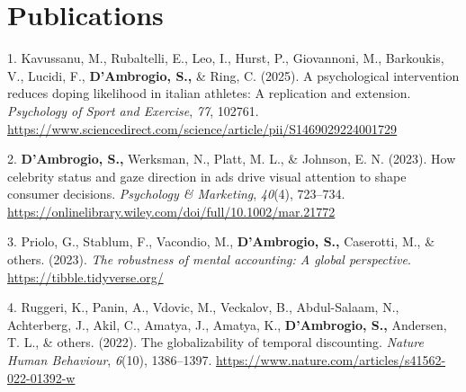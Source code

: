 \documentclass[11pt,a4paper,]{awesome-cv}
\newlength{\cslhangindent}
\newenvironment{CSLReferences}[2] %
 {\begin{list}{}{%
  \setlength{\itemindent}{0pt}
  \setlength{\leftmargin}{0pt}
  \setlength{\parsep}{0pt}
  \ifodd #1
   \setlength{\leftmargin}{\cslhangindent}
   \setlength{\itemindent}{-1\cslhangindent}
  \fi
  \setlength{\itemsep}{#2\baselineskip}}}
 {\end{list}}
\begin{document}
\section{Publications}\label{publications}

\label{refs-c5ea07e26ef96443943e38a4ce333d99}
\begin{CSLReferences}{1}{0}
1. Kavussanu, M., Rubaltelli, E., Leo, I., Hurst, P., Giovannoni, M.,
Barkoukis, V., Lucidi, F., \textbf{D'Ambrogio, S.,} \& Ring, C. (2025).
A psychological intervention reduces doping likelihood in italian
athletes: A replication and extension. \emph{Psychology of Sport and
Exercise}, \emph{77}, 102761.
\url{https://www.sciencedirect.com/science/article/pii/S1469029224001729}

2. \textbf{D'Ambrogio, S.,} Werksman, N., Platt, M. L., \& Johnson, E.
N. (2023). How celebrity status and gaze direction in ads drive visual
attention to shape consumer decisions. \emph{Psychology \& Marketing},
\emph{40}(4), 723--734.
\url{https://onlinelibrary.wiley.com/doi/full/10.1002/mar.21772}

3. Priolo, G., Stablum, F., Vacondio, M., \textbf{D'Ambrogio, S.,}
Caserotti, M., \& others. (2023). \emph{The robustness of mental
accounting: A global perspective}. \url{https://tibble.tidyverse.org/}

4. Ruggeri, K., Panin, A., Vdovic, M., Veckalov, B., Abdul-Salaam, N.,
Achterberg, J., Akil, C., Amatya, J., Amatya, K., \textbf{D'Ambrogio,
S.,} Andersen, T. L., \& others. (2022). The globalizability of temporal
discounting. \emph{Nature Human Behaviour}, \emph{6}(10), 1386--1397.
\url{https://www.nature.com/articles/s41562-022-01392-w}

\end{CSLReferences}
\end{document}
